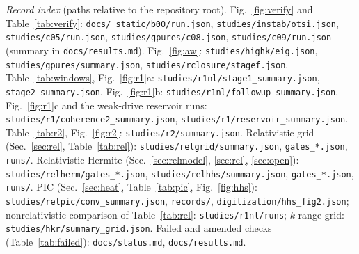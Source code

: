 \documentclass[aps,pre,reprint,floatfix,amsmath,amssymb,nofootinbib,superscriptaddress]{revtex4-2}
\begin{document}
{\raggedright\emph{Record index} (paths relative to the repository root). Fig.~\ref{fig:verify} and Table~\ref{tab:verify}: \texttt{docs/\_static/b00/run.json}, \texttt{studies/instab/otsi.json}, \texttt{studies/c05/run.json}, \texttt{studies/gpures/c08.json}, \texttt{studies/c09/run.json} (summary in \texttt{docs/results.md}). Fig.~\ref{fig:aw}: \texttt{studies/highk/eig.json}, \texttt{studies/gpures/summary.json}, \texttt{studies/rclosure/stagef.json}. Table~\ref{tab:windows}, Fig.~\ref{fig:r1}a: \texttt{studies/r1nl/stage1\_summary.json}, \texttt{stage2\_summary.json}. Fig.~\ref{fig:r1}b: \texttt{studies/r1nl/followup\_summary.json}. Fig.~\ref{fig:r1}c and the weak-drive reservoir runs: \texttt{studies/r1/coherence2\_summary.json}, \texttt{studies/r1/reservoir\_summary.json}. Table~\ref{tab:r2}, Fig.~\ref{fig:r2}: \texttt{studies/r2/summary.json}. Relativistic grid (Sec.~\ref{sec:rel}, Table~\ref{tab:rel}): \texttt{studies/relgrid/summary.json}, \texttt{gates\_*.json}, \texttt{runs/}. Relativistic Hermite (Sec.~\ref{sec:relmodel}, \ref{sec:rel}, \ref{sec:open}): \texttt{studies/relherm/gates\_*.json}, \texttt{studies/relhhs/summary.json}, \texttt{gates\_*.json}, \texttt{runs/}. PIC (Sec.~\ref{sec:heat}, Table~\ref{tab:pic}, Fig.~\ref{fig:hhs}): \texttt{studies/relpic/conv\_summary.json}, \texttt{records/}, \texttt{digitization/hhs\_fig2.json}; nonrelativistic comparison of Table~\ref{tab:rel}: \texttt{studies/r1nl/runs}; $k$-range grid: \texttt{studies/hkr/summary\_grid.json}. Failed and amended checks (Table~\ref{tab:failed}): \texttt{docs/status.md}, \texttt{docs/results.md}.\par}

\begin{acknowledgments}
\end{acknowledgments}


\end{document}
